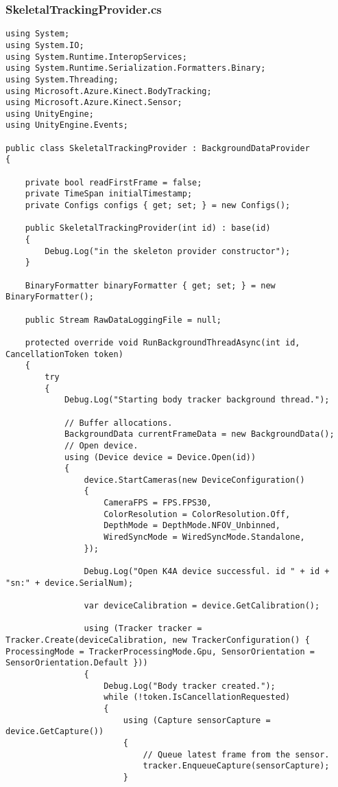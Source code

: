 \subsubsection*{SkeletalTrackingProvider.cs}
\begin{verbatim}
﻿using System;
using System.IO;
using System.Runtime.InteropServices;
using System.Runtime.Serialization.Formatters.Binary;
using System.Threading;
using Microsoft.Azure.Kinect.BodyTracking;
using Microsoft.Azure.Kinect.Sensor;
using UnityEngine;
using UnityEngine.Events;

public class SkeletalTrackingProvider : BackgroundDataProvider
{
    
    private bool readFirstFrame = false;
    private TimeSpan initialTimestamp;
    private Configs configs { get; set; } = new Configs();

    public SkeletalTrackingProvider(int id) : base(id)
    {
        Debug.Log("in the skeleton provider constructor");
    }

    BinaryFormatter binaryFormatter { get; set; } = new BinaryFormatter();

    public Stream RawDataLoggingFile = null;

    protected override void RunBackgroundThreadAsync(int id, CancellationToken token)
    {
        try
        {
            Debug.Log("Starting body tracker background thread.");

            // Buffer allocations.
            BackgroundData currentFrameData = new BackgroundData();
            // Open device.
            using (Device device = Device.Open(id))
            {
                device.StartCameras(new DeviceConfiguration()
                {
                    CameraFPS = FPS.FPS30,
                    ColorResolution = ColorResolution.Off,
                    DepthMode = DepthMode.NFOV_Unbinned,
                    WiredSyncMode = WiredSyncMode.Standalone,
                });

                Debug.Log("Open K4A device successful. id " + id + "sn:" + device.SerialNum);

                var deviceCalibration = device.GetCalibration();

                using (Tracker tracker = Tracker.Create(deviceCalibration, new TrackerConfiguration() { ProcessingMode = TrackerProcessingMode.Gpu, SensorOrientation = SensorOrientation.Default }))
                {
                    Debug.Log("Body tracker created.");
                    while (!token.IsCancellationRequested)
                    {
                        using (Capture sensorCapture = device.GetCapture())
                        {
                            // Queue latest frame from the sensor.
                            tracker.EnqueueCapture(sensorCapture);
                        }


\end{verbatim}
